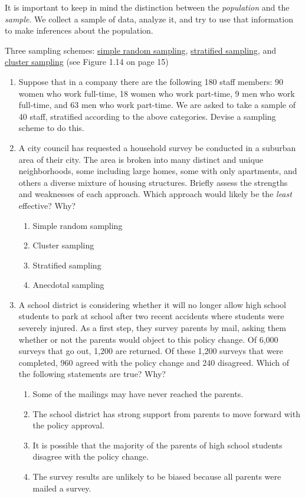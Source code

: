 \documentclass[10pt]{article}
\begin{document}
It is important to keep in mind the distinction between the \emph{population} and the \emph{sample}. We collect a sample of data, analyze it, and try to use that information to make inferences about the population. 

Three sampling schemes: \href{http://en.wikipedia.org/wiki/Simple_random_sampling}{simple random sampling}, \href{http://en.wikipedia.org/wiki/Stratified_sampling}{stratified sampling}, and \href{http://en.wikipedia.org/wiki/Cluster_sampling}{cluster sampling} (see Figure 1.14 on page 15)

\begin{enumerate}
  \item Suppose that in a company there are the following 180 staff members: 90 women who work full-time, 18 women who work part-time, 9 men who work full-time, and 63 men who work part-time. We are asked to take a sample of 40 staff, stratified according to the above categories. Devise a sampling scheme to do this. 
  \vspace{1.2in}
  \item A city council has requested a household survey be conducted in a suburban area of their city. The area is broken into many distinct and unique neighborhoods, some including large homes, some with only apartments, and others a diverse mixture of housing structures. Briefly assess the strengths and weaknesses of each approach. Which approach would likely be the \emph{least} effective? Why?
  \begin{enumerate}
  \itemsep0.25in
\item Simple random sampling
\item{Cluster sampling}
\item Stratified sampling
\item Anecdotal sampling
\end{enumerate}

  \item A school district is considering whether it will no longer allow high school students to park at school after two recent accidents where students were severely injured. As a first step, they survey parents by mail, asking them whether or not the parents would object to this policy change. Of 6,000 surveys that go out, 1,200 are returned. Of these 1,200 surveys that were completed, 960 agreed with the policy change and 240 disagreed. Which of the following statements are true? Why?

\begin{enumerate}
  \itemsep0.25in
\item Some of the mailings may have never reached the parents.
\item The school district has strong support from parents to move forward with the policy approval.
\item It is possible that the majority of the parents of high school students disagree with the policy change.
\item The survey results are unlikely to be biased because all parents were mailed a survey. 
\end{enumerate}

\end{enumerate}
\end{document}
